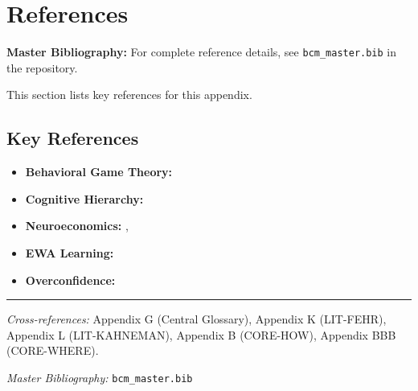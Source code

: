 \section{References}
\label{sec:ca-references}

\begin{tcolorbox}[colback=blue!5!white, colframe=blue!75!black]
\textbf{Master Bibliography:} For complete reference details, see
\texttt{bcm\_master.bib} in the repository.

This section lists key references for this appendix.
\end{tcolorbox}

\vspace{0.5em}

\subsection{Key References}

\begin{itemize}[nosep]
    \item \textbf{Behavioral Game Theory:} \citet{PAP-camerer2003behavioral}
    \item \textbf{Cognitive Hierarchy:} \citet{PAP-camerer2004cognitive}
    \item \textbf{Neuroeconomics:} \citet{PAP-camerer2004neuroeconomics}, \citet{fehr2007neurobiology}
    \item \textbf{EWA Learning:} \citet{PAP-camerer2005frame}
    \item \textbf{Overconfidence:} \citet{PAP-camerer1999overconfidence}
\end{itemize}

\nocite{bcm_master}



\vspace{1em}
\hrule
\vspace{0.5em}

\noindent\textit{Cross-references:}
Appendix G (Central Glossary),
Appendix K (LIT-FEHR),
Appendix L (LIT-KAHNEMAN),
Appendix B (CORE-HOW),
Appendix BBB (CORE-WHERE).

\noindent\textit{Master Bibliography:} \texttt{bcm\_master.bib}


